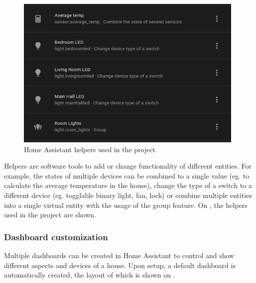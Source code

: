 \begin{figure}[!ht]
  \centering
  \includegraphics[width=110mm, keepaspectratio]{figures/homeassistant_helpers.png}
  \caption{Home Assistant helpers used in the project}
  \label{fig:HAhelpers}
\end{figure}

Helpers are software tools to add or change functionality of different entities. For example, the states of multiple devices can be combined to a single value (eg. to calculate the average temperature in the house), change the type of a switch to a different device (eg. togglable binary light, fan, lock) or combine multiple entities into a single virtual entity with the usage of the group feature. On , the helpers used in the project are shown.

\subsubsection{Dashboard customization}

Multiple dashboards can be created in Home Assistant to control and show different aspects and devices of a house. Upon setup, a default dashboard is automatically created, the layout of which is shown on .

